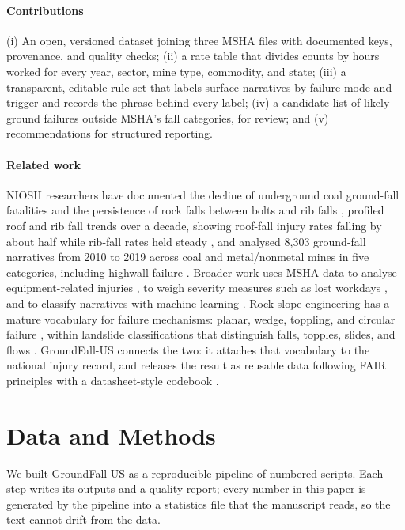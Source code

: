 \documentclass[letterpaper,twocolumn,10pt]{article}
\begin{document}
\paragraph{Contributions}
(i) An open, versioned dataset joining three MSHA files with documented keys, provenance, and quality checks; (ii) a rate table that divides counts by hours worked for every year, sector, mine type, commodity, and state; (iii) a transparent, editable rule set that labels surface narratives by failure mode and trigger and records the phrase behind every label; (iv) a candidate list of likely ground failures outside MSHA's fall categories, for review; and (v) recommendations for structured reporting.

\paragraph{Related work}
NIOSH researchers have documented the decline of underground coal ground-fall fatalities and the persistence of rock falls between bolts and rib falls \citep{MarkPappasBarczak2009}, profiled roof and rib fall trends over a decade, showing roof-fall injury rates falling by about half while rib-fall rates held steady \citep{PappasMark2012}, and analysed 8,303 ground-fall narratives from 2010 to 2019 across coal and metal/nonmetal mines in five categories, including highwall failure \citep{Khademian2022}. Broader work uses MSHA data to analyse equipment-related injuries \citep{Groves2007}, to weigh severity measures such as lost workdays \citep{ColemanKerkering2007}, and to classify narratives with machine learning \citep{Ganguli2021}. Rock slope engineering has a mature vocabulary for failure mechanisms: planar, wedge, toppling, and circular failure \citep{WyllieMah2004,GoodmanBray1976,ReadStacey2009}, within landslide classifications that distinguish falls, topples, slides, and flows \citep{Varnes1978,Hungr2014}. GroundFall-US connects the two: it attaches that vocabulary to the national injury record, and releases the result as reusable data following FAIR principles \citep{Wilkinson2016} with a datasheet-style codebook \citep{Gebru2021}.

\section{Data and Methods}
We built GroundFall-US as a reproducible pipeline of numbered scripts. Each step writes its outputs and a quality report; every number in this paper is generated by the pipeline into a statistics file that the manuscript reads, so the text cannot drift from the data.
\end{document}
